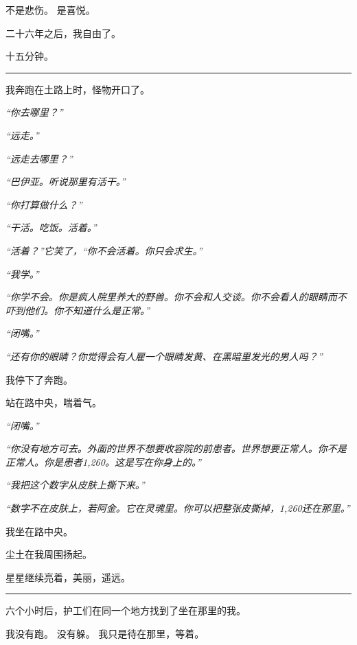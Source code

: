 \noindent 不是悲伤。
是喜悦。

\noindent 二十六年之后，我自由了。

\noindent 十五分钟。

\vspace{0.5em}\noindent\rule{\textwidth}{0.5pt}\vspace{0.5em}

\noindent 我奔跑在土路上时，怪物开口了。

\noindent \textit{“你去哪里？”}

\noindent \textit{“远走。”}

\noindent \textit{“远走去哪里？”}

\noindent \textit{“巴伊亚。听说那里有活干。”}

\noindent \textit{“你打算做什么？”}

\noindent \textit{“干活。吃饭。活着。”}

\noindent \textit{“活着？”它笑了，“你不会活着。你只会求生。”}

\noindent \textit{“我学。”}

\noindent \textit{“你学不会。你是疯人院里养大的野兽。你不会和人交谈。你不会看人的眼睛而不吓到他们。你不知道什么是正常。”}

\noindent \textit{“闭嘴。”}

\noindent \textit{“还有你的眼睛？你觉得会有人雇一个眼睛发黄、在黑暗里发光的男人吗？”}

\noindent 我停下了奔跑。

\noindent 站在路中央，喘着气。

\noindent \textit{“闭嘴。”}

\noindent \textit{“你没有地方可去。外面的世界不想要收容院的前患者。世界想要正常人。你不是正常人。你是患者1,260。这是写在你身上的。”}

\noindent \textit{“我把这个数字从皮肤上撕下来。”}

\noindent \textit{“数字不在皮肤上，若阿金。它在灵魂里。你可以把整张皮撕掉，1,260还在那里。”}

\noindent 我坐在路中央。

\noindent 尘土在我周围扬起。

\noindent 星星继续亮着，美丽，遥远。

\vspace{0.5em}\noindent\rule{\textwidth}{0.5pt}\vspace{0.5em}

\noindent 六个小时后，护工们在同一个地方找到了坐在那里的我。

\noindent 我没有跑。
没有躲。
我只是待在那里，等着。

